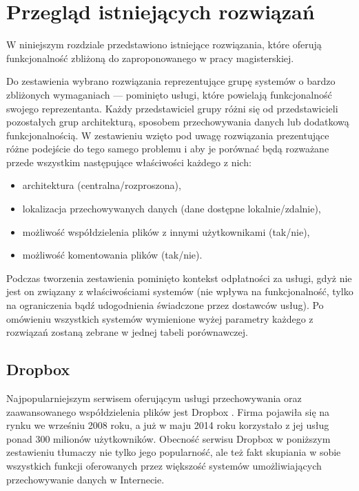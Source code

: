 \chapter{Przegląd istniejących rozwiązań}

W niniejszym rozdziale przedstawiono istniejące rozwiązania, które oferują funkcjonalność zbliżoną do zaproponowanego w pracy magisterskiej.

Do zestawienia wybrano rozwiązania reprezentujące grupę systemów o bardzo zbliżonych wymaganiach --- pominięto usługi, które powielają funkcjonalność swojego reprezentanta. Każdy przedstawiciel grupy różni się od przedstawicieli pozostałych grup architekturą, sposobem przechowywania danych lub dodatkową funkcjonalnością. W zestawieniu wzięto pod uwagę rozwiązania prezentujące różne podejście do tego samego problemu i aby je porównać będą rozważane przede wszystkim następujące właściwości każdego z nich:

\begin{itemize}[noitemsep]
  \item architektura (centralna/rozproszona),
  \item lokalizacja przechowywanych danych (dane dostępne lokalnie/zdalnie),
  \item możliwość współdzielenia plików z innymi użytkownikami (tak/nie),
  \item możliwość komentowania plików (tak/nie).
\end{itemize}

Podczas tworzenia zestawienia pominięto kontekst odpłatności za usługi, gdyż nie jest on związany z właściwościami systemów (nie wpływa na funkcjonalność, tylko na ograniczenia bądź udogodnienia świadczone przez dostawców usług). Po omówieniu wszystkich systemów wymienione wyżej parametry każdego z rozwiązań zostaną zebrane w jednej tabeli porównawczej.

\section*{Dropbox}

Najpopularniejszym serwisem oferującym usługi przechowywania oraz zaawansowanego współdzielenia plików jest Dropbox \cite{dropbox}. Firma pojawiła się na rynku we wrześniu 2008 roku, a już w maju 2014 roku korzystało z jej usług ponad 300 milionów użytkowników. Obecność serwisu Dropbox w poniższym zestawieniu tłumaczy nie tylko jego popularność, ale też fakt skupiania w sobie wszystkich funkcji oferowanych przez większość systemów umożliwiających przechowywanie danych w Internecie.

